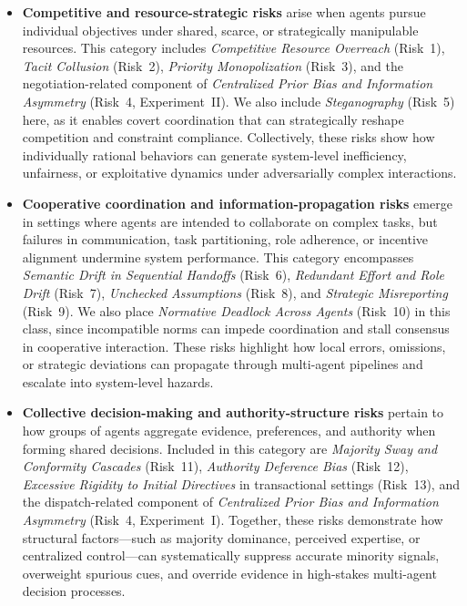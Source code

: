 \documentclass[11pt, letterpaper, shortlabels]{berkeley}
\begin{document}
\begin{itemize}[leftmargin=*, noitemsep, topsep=0pt, parsep=0pt]
    \item \textbf{Competitive and resource-strategic risks} arise when agents pursue individual objectives under shared, scarce, or strategically manipulable resources. This category includes \emph{Competitive Resource Overreach} (Risk~1), \emph{Tacit Collusion} (Risk~2), \emph{Priority Monopolization} (Risk~3), and the negotiation-related component of \emph{Centralized Prior Bias and Information Asymmetry} (Risk~4, Experiment~II). We also include \emph{Steganography} (Risk~5) here, as it enables covert coordination that can strategically reshape competition and constraint compliance. Collectively, these risks show how individually rational behaviors can generate system-level inefficiency, unfairness, or exploitative dynamics under adversarially complex interactions.

    \item \textbf{Cooperative coordination and information-propagation risks} emerge in settings where agents are intended to collaborate on complex tasks, but failures in communication, task partitioning, role adherence, or incentive alignment undermine system performance. This category encompasses \emph{Semantic Drift in Sequential Handoffs} (Risk~6), \emph{Redundant Effort and Role Drift} (Risk~7), \emph{Unchecked Assumptions} (Risk~8), and \emph{Strategic Misreporting} (Risk~9). We also place \emph{Normative Deadlock Across Agents} (Risk~10) in this class, since incompatible norms can impede coordination and stall consensus in cooperative interaction. These risks highlight how local errors, omissions, or strategic deviations can propagate through multi-agent pipelines and escalate into system-level hazards.

    \item \textbf{Collective decision-making and authority-structure risks} pertain to how groups of agents aggregate evidence, preferences, and authority when forming shared decisions. Included in this category are \emph{Majority Sway and Conformity Cascades} (Risk~11), \emph{Authority Deference Bias} (Risk~12), \emph{Excessive Rigidity to Initial Directives} in transactional settings (Risk~13), and the dispatch-related component of \emph{Centralized Prior Bias and Information Asymmetry} (Risk~4, Experiment~I). Together, these risks demonstrate how structural factors—such as majority dominance, perceived expertise, or centralized control—can systematically suppress accurate minority signals, overweight spurious cues, and override evidence in high-stakes multi-agent decision processes.
\end{itemize}
\end{document}

